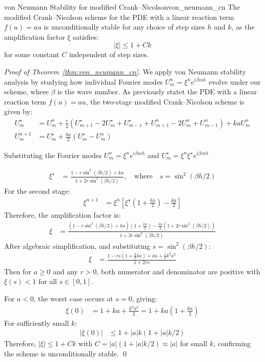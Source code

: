 \begin{theorem}{von Neumann Stability for modified Crank--Nicolson}{von_neumann_cn}
  The modified Crank--Nicolson scheme for the PDE with a linear reaction term $f(u) = au$ is unconditionally
  stable for any choice of step sizes $h$ and $k$, as the amplification factor $\xi$ satisfies:
  \[
    |\xi| \leq 1 + Ck
  \]
  for some constant $C$ independent of step sizes.
\end{theorem}

\begin{proof}[Proof of Theorem~\ref{thm:von_neumann_cn}]

  We apply von Neumann stability analysis by studying how individual Fourier modes $U_m^n = \xi^n e^{i\beta mh}$
  evolve under our scheme, where $\beta$ is the wave number.
  \medskip
  As previously statet the PDE with a linear reaction term $f(u) = au$, the two-stage modified Crank--Nicolson
  scheme is given by:
  \begin{align*}
    U_m^\star & = U_m^n + \frac{r}{2}\left(U_{m+1}^\star - 2U_m^\star + U_{m-1}^\star + U_{m+1}^n - 2U_m^n + U_{m-1}^n\right) + kaU_m^n \\
    U_m^{n+1} & = U_m^\star + \frac{ka}{2}(U_m^\star - U_m^n)
  \end{align*}

  Substituting the Fourier modes $U_m^n = \xi^n e^{i\beta mh}$ and $U_m^\star = \xi^n \xi^\star e^{i\beta mh}$

  \begin{align*}
    \xi^\star & = \frac{1 - r\sin^2(\beta h/2) + ka}{1 + 2r\sin^2(\beta h/2)}, \quad \text{where}\quad s = \sin^2(\beta h/2)
  \end{align*}
  For the second stage:
  \begin{align*}
    \xi^{n+1} & = \xi^n\left[\xi^\star\left(1 + \frac{ka}{2}\right) - \frac{ka}{2}\right]
  \end{align*}
  Therefore, the amplification factor is:
  \begin{align*}
    \xi & = \frac{\left(1 - r\sin^2(\beta h/2) + ka\right)\left(1 + \frac{ka}{2}\right) - \frac{ka}{2}\left(1 + 2r\sin^2(\beta h/2)\right)}{1 + 2r\sin^2(\beta h/2)}
  \end{align*}
  After algebraic simplification, and substituting $s = \sin^2(\beta h/2)$:
  \begin{align*}
    \xi & = \frac{1 - rs(1 + \tfrac{3}{2}ka) + ka + \tfrac{1}{2}k^2a^2}{1 + 2rs}
  \end{align*}
  Then for $a \geq 0$ and any $r > 0$, both numerator and denominator are positive with $\xi(s) < 1$ for all
  $s \in [0,1]$.

  For $a < 0$, the worst case occurs at $s = 0$, giving:
  \begin{align*}
    \xi(0) & = 1 + ka + \frac{k^2a^2}{2} = 1 + ka\left(1 + \frac{ka}{2}\right)
  \end{align*}
  For sufficiently small $k$:
  \begin{align*}
    |\xi(0)| & \leq 1 + |a|k(1 + |a|k/2)
  \end{align*}
  Therefore, $|\xi| \leq 1 + Ck$ with $C = |a|(1 + |a|k/2) \approx |a|$ for small $k$, confirming the scheme is unconditionally stable. \qed
\end{proof}
\clearpage
